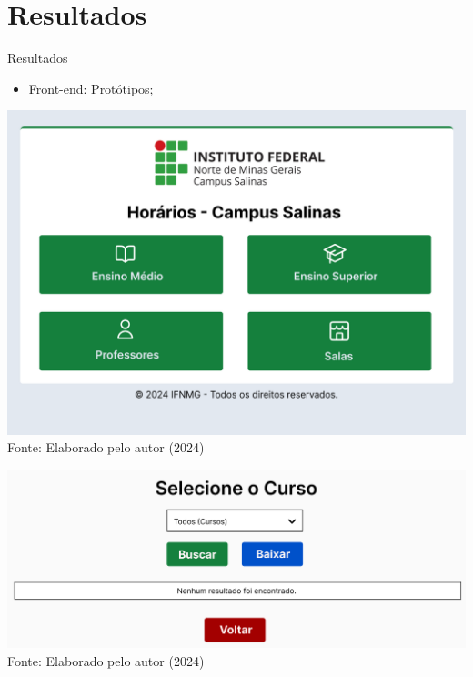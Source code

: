 \section{Resultados}

\begin{frame}{Resultados}
    \begin{itemize}
        \item Front-end: Protótipos;
    \end{itemize}
    \begin{minipage}{0.48\textwidth}
        \centering
        \includegraphics[width=1\textwidth]{figuras/proto-1.png}
        \footnotesize Fonte: Elaborado pelo autor (2024)
    \end{minipage}
    \hfill
    \begin{minipage}{0.48\textwidth}
        \centering
        \includegraphics[width=1\textwidth]{figuras/proto-2.png}
        \footnotesize Fonte: Elaborado pelo autor (2024)
    \end{minipage}
\end{frame}

